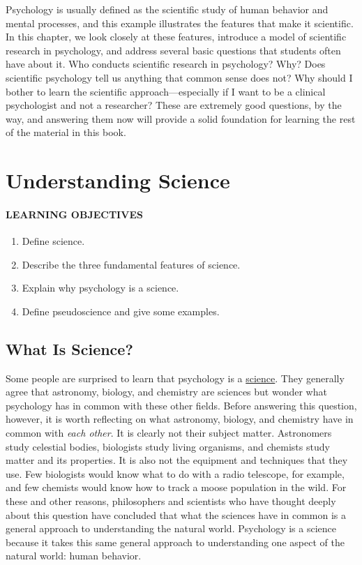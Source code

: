 \documentclass[
]{krantz}
\providecommand{\tightlist}{%
  \setlength{\itemsep}{0pt}\setlength{\parskip}{0pt}}
\begin{document}
Psychology is usually defined as the scientific study of human behavior and mental processes, and this example illustrates the features that make it scientific. In this chapter, we look closely at these features, introduce a model of scientific research in psychology, and address several basic questions that students often have about it. Who conducts scientific research in psychology? Why? Does scientific psychology tell us anything that common sense does not? Why should I bother to learn the scientific approach---especially if I want to be a clinical psychologist and not a researcher? These are extremely good questions, by the way, and answering them now will provide a solid foundation for learning the rest of the material in this book.

\section{Understanding Science}\label{understanding-science}

\paragraph*{LEARNING OBJECTIVES}\label{learning-objectives}

\begin{enumerate}
\def\labelenumi{\arabic{enumi}.}
\tightlist
\item
  Define science.
\item
  Describe the three fundamental features of science.
\item
  Explain why psychology is a science.
\item
  Define pseudoscience and give some examples.
\end{enumerate}

\subsection*{What Is Science?}\label{what-is-science}


Some people are surprised to learn that psychology is a \hyperref[science]{science}. They generally agree that astronomy, biology, and chemistry are sciences but wonder what psychology has in common with these other fields. Before answering this question, however, it is worth reflecting on what astronomy, biology, and chemistry have in common with \emph{each other}. It is clearly not their subject matter. Astronomers study celestial bodies, biologists study living organisms, and chemists study matter and its properties. It is also not the equipment and techniques that they use. Few biologists would know what to do with a radio telescope, for example, and few chemists would know how to track a moose population in the wild. For these and other reasons, philosophers and scientists who have thought deeply about this question have concluded that what the sciences have in common is a general approach to understanding the natural world. Psychology is a science because it takes this same general approach to understanding one aspect of the natural world: human behavior.
\end{document}
